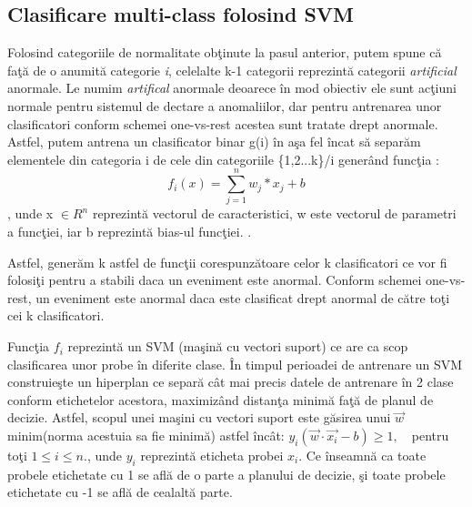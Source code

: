 \documentclass[a4paper,12pt]{report}
\begin{document}
\subsection{Clasificare multi-class folosind SVM}
\quad Folosind categoriile de normalitate obţinute la pasul anterior, putem spune că faţă de o anumită categorie \emph{i}, celelalte k-1 categorii reprezintă categorii \emph{artificial} anormale. Le numim \emph{artifical} anormale deoarece în mod obiectiv ele sunt acţiuni normale pentru sistemul de dectare a anomaliilor, dar pentru antrenarea unor clasificatori conform schemei one-vs-rest acestea sunt tratate drept anormale. Astfel, putem antrena un clasificator binar g(i) în aşa fel încat să separăm elementele din categoria i de cele din categoriile \{1,2...k\}/i 
generând funcţia : \[f_{i}(x) = \sum_{j  = 1}^{n} w_{j} * x_{j} + b\], unde x \(\in{R}^n\) reprezintă vectorul de caracteristici, w este vectorul de parametri a funcţiei, iar b reprezintă bias-ul funcţiei. \cite{ionescu2019object}.
\par Astfel, generăm k astfel de funcţii corespunzătoare celor k clasificatori ce vor fi folosiţi pentru a stabili daca un eveniment este anormal. Conform schemei one-vs-rest, un eveniment este anormal daca este clasificat drept anormal de către toţi cei k clasificatori.
\par Funcţia \(f_{i}\) reprezintă un SVM (maşină cu vectori suport) ce are ca scop clasificarea unor probe în diferite clase. În timpul perioadei de antrenare un SVM construieşte un hiperplan ce separă cât mai precis datele de antrenare în 2 clase conform etichetelor acestora, maximizând distanţa minimă faţă de planul de decizie. Astfel, scopul unei maşini cu vectori suport este găsirea unui \(\vec{w} \) minim(norma acestuia sa fie minimă)  astfel încât: \( y_{i}(\vec{w} \cdot \vec{x_{i}} - b) \ge 1, \quad \)pentru toţi \( 1 \le i \le n.\), unde \(y_{i} \) reprezintă eticheta probei \(x_{i}\). Ce înseamnă ca toate probele etichetate cu 1 se află de o parte a planului de decizie, şi toate probele etichetate cu -1 se află de cealaltă parte. 
\end{document}
